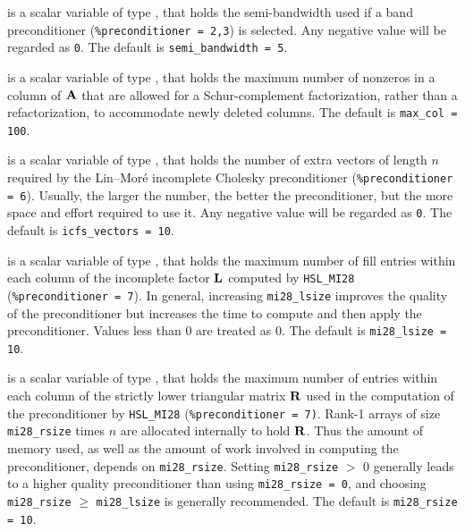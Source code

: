 \documentclass{galahad}
\begin{document}
\begin{description}
 is a scalar variable of type \integer, that holds
the semi-bandwidth used if a band preconditioner ({\tt \%preconditioner = 2,3})
is selected. Any negative value will be regarded as {\tt 0}.
The default is {\tt semi\_bandwidth = 5}.



 is a scalar variable of type \integer, that holds
the maximum number of nonzeros in a column of ${\mathbf{A}}$ that are allowed
for a Schur-complement factorization, rather than a refactorization, 
to accommodate newly deleted columns.
The default is {\tt max\_col = 100}.

 is a scalar variable of type \integer, that holds
the number of extra vectors of length $n$ required by the Lin--Mor\'{e} 
incomplete Cholesky preconditioner ({\tt \%preconditioner = 6}).
Usually, the larger the number, the
better the preconditioner, but the more space and effort required to
use it. Any negative value will be regarded as {\tt 0}.
The default is {\tt icfs\_vectors = 10}.

 is a scalar variable of type \integer, that holds
the maximum number of fill entries within each column of the incomplete
factor ${\mathbf{L}}$ computed by {\tt HSL\_MI28} ({\tt \%preconditioner = 7}).
In general, increasing {\tt mi28\_lsize} improves
the quality of the preconditioner but increases the time to compute
and then apply the preconditioner. Values less than 0 are treated as 0.
The default is {\tt mi28\_lsize = 10}.

 is a scalar variable of type \integer, that holds
the maximum number of entries within each column of the strictly lower
triangular matrix ${\mathbf{R}}$ used in the computation of the preconditioner by
{\tt HSL\_MI28} ({\tt \%preconditioner = 7)}.
Rank-1 arrays of size {\tt mi28\_rsize} times $n$ are allocated internally
to hold ${\mathbf{R}}$. Thus the amount of memory used, as well as the amount of work
involved in computing the preconditioner, depends on {\tt mi28\_rsize}. 
Setting {\tt mi28\_rsize} $>$ 0 generally leads to a higher quality 
preconditioner than using {\tt mi28\_rsize = 0}, and choosing 
{\tt mi28\_rsize} $\geq$  {\tt mi28\_lsize} is generally recommended.
The default is {\tt mi28\_rsize = 10}.


\end{description}
\end{document}
